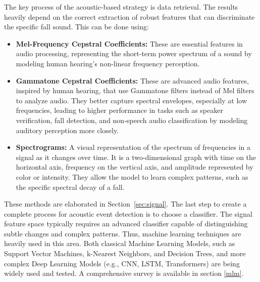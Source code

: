 \documentclass[11pt, a4paper, twoside]{article}
\begin{document}
The key process of the acoustic-based strategy is data retrieval. The results heavily depend on the correct extraction of robust features that can discriminate the specific fall sound. This can be done using:

\begin{itemize}
    \item \textbf{Mel-Frequency Cepstral Coefficients:} These are essential features in audio processing, representing the short-term power spectrum of a sound by modeling human hearing's non-linear frequency perception.
    \item \textbf{Gammatone Cepstral Coefficients:} These are advanced audio features, inspired by human hearing, that use Gammatone filters instead of Mel filters to analyze audio. They better capture spectral envelopes, especially at low frequencies, leading to higher performance in tasks such as speaker verification, fall detection, and non-speech audio classification by modeling auditory perception more closely.
    \item \textbf{Spectrograms:} A visual representation of the spectrum of frequencies in a signal as it changes over time. It is a two-dimensional graph with time on the horizontal axis, frequency on the vertical axis, and amplitude represented by color or intensity. They allow the model to learn complex patterns, such as the specific spectral decay of a fall.
\end{itemize}

These methods are elaborated in Section~\ref{sec:signal}.
\newline
The last step to create a complete process for acoustic event detection is to choose a classifier. The signal feature space typically requires an advanced classifier capable of distinguishing subtle changes and complex patterns. Thus, machine learning techniques are heavily used in this area. Both classical Machine Learning Models, such as Support Vector Machines, k-Nearest Neighbors, and Decision Trees, and more complex Deep Learning Models (e.g., CNN, LSTM, Transformers) are being widely used and tested. A comprehensive survey is available in section \ref{mlm}. 
\newline
\newline
\end{document}
